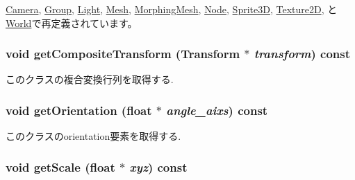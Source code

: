 \hyperlink{classm3g_1_1Camera_8aad1ceab4c2a03609c8a42324ce484d}{Camera}, \hyperlink{classm3g_1_1Group_8aad1ceab4c2a03609c8a42324ce484d}{Group}, \hyperlink{classm3g_1_1Light_8aad1ceab4c2a03609c8a42324ce484d}{Light}, \hyperlink{classm3g_1_1Mesh_82cfeb67ca66b93e2ca7bda9a4f0e2aa}{Mesh}, \hyperlink{classm3g_1_1MorphingMesh_8aad1ceab4c2a03609c8a42324ce484d}{MorphingMesh}, \hyperlink{classm3g_1_1Node_8aad1ceab4c2a03609c8a42324ce484d}{Node}, \hyperlink{classm3g_1_1Sprite3D_8aad1ceab4c2a03609c8a42324ce484d}{Sprite3D}, \hyperlink{classm3g_1_1Texture2D_82cfeb67ca66b93e2ca7bda9a4f0e2aa}{Texture2D}, と \hyperlink{classm3g_1_1World_8aad1ceab4c2a03609c8a42324ce484d}{World}で再定義されています。\hypertarget{classm3g_1_1Transformable_263ef66efed11b7f9678e2e4bbec4c55}{
\subsubsection[{getCompositeTransform}]{\setlength{\rightskip}{0pt plus 5cm}void getCompositeTransform ({\bf Transform} $\ast$ {\em transform}) const}}
\label{classm3g_1_1Transformable_263ef66efed11b7f9678e2e4bbec4c55}


このクラスの複合変換行列を取得する. \hypertarget{classm3g_1_1Transformable_06125ab0d85ef8c5c7ace9ced04993f3}{
\subsubsection[{getOrientation}]{\setlength{\rightskip}{0pt plus 5cm}void getOrientation (float $\ast$ {\em angle\_\-aixs}) const}}
\label{classm3g_1_1Transformable_06125ab0d85ef8c5c7ace9ced04993f3}


このクラスのorientation要素を取得する. \hypertarget{classm3g_1_1Transformable_b8a2dd11d0ba90e138625eb86a6a6083}{
\subsubsection[{getScale}]{\setlength{\rightskip}{0pt plus 5cm}void getScale (float $\ast$ {\em xyz}) const}}
\label{classm3g_1_1Transformable_b8a2dd11d0ba90e138625eb86a6a6083}


